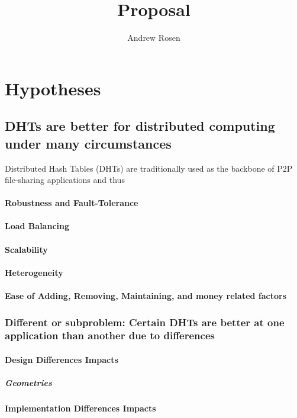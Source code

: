 \documentclass[10pt,letterpaper]{report}
\title{Proposal}
\author{Andrew Rosen}
\begin{document}
\maketitle
\setcounter{tocdepth}{4}
\tableofcontents
\newpage
\chapter{Hypotheses}

\section{DHTs are better for distributed computing under many circumstances}
Distributed Hash Tables (DHTs) are traditionally used as the backbone of P2P file-sharing applications and thus 


\subsubsection{Robustness and Fault-Tolerance}
\subsubsection{Load Balancing}
\subsubsection{Scalability}
\subsubsection{Heterogeneity}
\subsubsection{Ease of Adding, Removing, Maintaining, and money related factors}

\subsection{Different or subproblem: Certain DHTs are better at one application than another due to differences}
\subsubsection{Design Differences Impacts}
\paragraph{Geometries}
\subsubsection{Implementation Differences Impacts}
\end{document}
